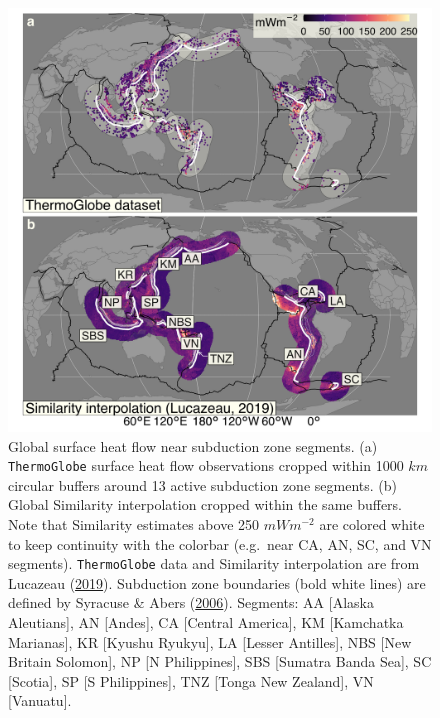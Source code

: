 \begin{figure}[htbp]

{\centering \includegraphics[width=1\linewidth,]{assets/figs/chpt3/ThermoGlobeBufferComp} 

}

\caption[Similarity interpolation of near 13 active subduction zone segments]{Global surface heat flow near subduction zone segments. (a) \texttt{ThermoGlobe} surface heat flow observations cropped within 1000 \(km\) circular buffers around 13 active subduction zone segments. (b) Global Similarity interpolation cropped within the same buffers. Note that Similarity estimates above 250 \(mWm^{-2}\) are colored white to keep continuity with the colorbar (e.g.~near CA, AN, SC, and VN segments). \texttt{ThermoGlobe} data and Similarity interpolation are from Lucazeau (\protect\hyperlink{ref-lucazeau2019}{2019}). Subduction zone boundaries (bold white lines) are defined by Syracuse \& Abers (\protect\hyperlink{ref-syracuse2006}{2006}). Segments: AA {[}Alaska Aleutians{]}, AN {[}Andes{]}, CA {[}Central America{]}, KM {[}Kamchatka Marianas{]}, KR {[}Kyushu Ryukyu{]}, LA {[}Lesser Antilles{]}, NBS {[}New Britain Solomon{]}, NP {[}N Philippines{]}, SBS {[}Sumatra Banda Sea{]}, SC {[}Scotia{]}, SP {[}S Philippines{]}, TNZ {[}Tonga New Zealand{]}, VN {[}Vanuatu{]}.}\label{fig:similarityBuffer}
\end{figure}

